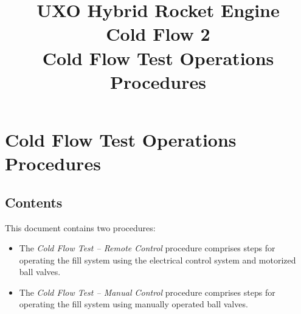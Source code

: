 

\title{
\Huge UXO Hybrid Rocket Engine\\
Cold Flow 2\\
\vspace{1cm}
\Large Cold Flow Test Operations Procedures}





\section{Cold Flow Test Operations Procedures}

\subsection{Contents}
This document contains two procedures:
\begin{itemize}
    \item The \textit{Cold Flow Test – Remote Control} procedure comprises steps for operating the fill system using the electrical control system and motorized ball valves.
    \item The \textit{Cold Flow Test – Manual Control} procedure comprises steps for operating the fill system using manually operated ball valves.
\end{itemize}

